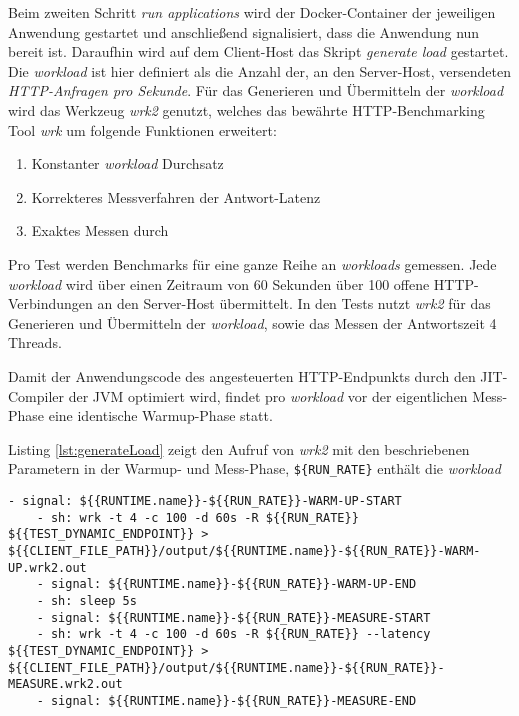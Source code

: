   Beim zweiten Schritt \textit{run applications} wird der Docker-Container der jeweiligen Anwendung gestartet und anschließend signalisiert,
  dass die Anwendung nun bereit ist. 
  Daraufhin wird auf dem Client-Host das Skript \textit{generate load} gestartet.
  Die \textit{workload} ist hier definiert als die Anzahl der, an den Server-Host, versendeten \textit{HTTP-Anfragen pro Sekunde}.
  Für das Generieren und Übermitteln der \textit{workload} wird das Werkzeug \textit{wrk2} genutzt, welches das 
  bewährte HTTP-Benchmarking Tool \textit{wrk} um folgende Funktionen erweitert:
  \begin{enumerate}
      \item Konstanter \textit{workload} Durchsatz
      \item Korrekteres Messverfahren der Antwort-Latenz
      \item Exaktes Messen durch 
  \end{enumerate}\cite{Wrk2, Wrk}

  Pro Test werden Benchmarks für eine ganze Reihe an \textit{workloads} gemessen.
  Jede \textit{workload} wird über einen Zeitraum von 60 Sekunden über 100 offene HTTP-Verbindungen an den Server-Host übermittelt.
  In den Tests nutzt \textit{wrk2} für das Generieren und Übermitteln der \textit{workload}, sowie das Messen der Antwortszeit
  4 Threads.
  
  Damit der Anwendungscode des angesteuerten HTTP-Endpunkts durch den JIT-Compiler der JVM optimiert wird, 
  findet pro \textit{workload} vor der eigentlichen Mess-Phase eine identische Warmup-Phase statt.

  Listing \ref*{lst:generateLoad} zeigt den Aufruf von \textit{wrk2} mit den beschriebenen Parametern in der Warmup- und Mess-Phase,
   \verb|${RUN_RATE}| enthält die \textit{workload}

  \begin{lstlisting}[caption=Auszug des qDup Skripts generate load, captionpos=b, label=lst:generateLoad]
    - signal: ${{RUNTIME.name}}-${{RUN_RATE}}-WARM-UP-START
    - sh: wrk -t 4 -c 100 -d 60s -R ${{RUN_RATE}} ${{TEST_DYNAMIC_ENDPOINT}} > ${{CLIENT_FILE_PATH}}/output/${{RUNTIME.name}}-${{RUN_RATE}}-WARM-UP.wrk2.out
    - signal: ${{RUNTIME.name}}-${{RUN_RATE}}-WARM-UP-END
    - sh: sleep 5s
    - signal: ${{RUNTIME.name}}-${{RUN_RATE}}-MEASURE-START
    - sh: wrk -t 4 -c 100 -d 60s -R ${{RUN_RATE}} --latency ${{TEST_DYNAMIC_ENDPOINT}} > ${{CLIENT_FILE_PATH}}/output/${{RUNTIME.name}}-${{RUN_RATE}}-MEASURE.wrk2.out
    - signal: ${{RUNTIME.name}}-${{RUN_RATE}}-MEASURE-END
   \end{lstlisting}
  
